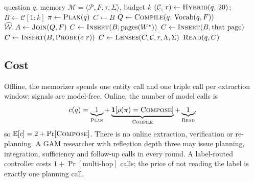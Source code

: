 \begin{algorithm}[t]
\caption{WitnessRAG researcher (one question)}\label{alg:researcher}
\begin{algorithmic}[1]
\Require question $q$, memory $\mathcal{M}=\langle\mathcal{P},F,\tau,\Sigma\rangle$, budget $k$
\State $(\mathcal{C},\,r)\gets\textsc{Hybrid}(q,\,20)$; \quad $B\gets\mathcal{C}[1{:}k]$
\State $\pi\gets\textsc{Plan}(q)$ 
\State $C\gets B$
 
  \State $Q\gets\textsc{Compile}(q,\,\mathrm{Vocab}(q,F))$ 
  \State $\widehat{\mathcal W},A\gets\textsc{Join}(Q,F)$ 
   
     \State $C\gets\textsc{Insert}(B,\mathrm{pages}(W^\star))$ 
     \State $C\gets\textsc{Insert}(B,\text{that page})$ 
     \State $C\gets\textsc{Insert}(B,\textsc{Probe}(e\ r))$ 
  \EndIf
\EndIf
\If{$\Lambda(\pi)\neq\emptyset$}
  \State $C\gets\textsc{Lenses}(C,\mathcal{C},r,\Lambda,\Sigma)$ 
\EndIf
\State \Return $\textsc{Read}(q,C)$ 
\end{algorithmic}
\end{algorithm}

\subsection{Cost}\label{sec:cost}

Offline, the memorizer spends one entity call and one triple call per
extraction window; signals are model-free. Online, the number of model calls
is
\begin{equation}
  c(q)=\underbrace{1}_{\textsc{Plan}}+\underbrace{\mathbf{1}[\rho(\pi)=\textsc{Compose}]}_{\textsc{Compile}}
  +\underbrace{1}_{\textsc{Read}},
  \label{eq:cost}
\end{equation}
so $\mathbb{E}[c]=2+\Pr[\textsc{Compose}]$. There is no online extraction,
verification or re-planning. A GAM researcher with reflection depth three may
issue planning, integration, sufficiency and follow-up calls in every round.
A label-routed controller costs $1+\Pr[\text{multi-hop}]$ calls; the price of
not reading the label is exactly one planning call.

